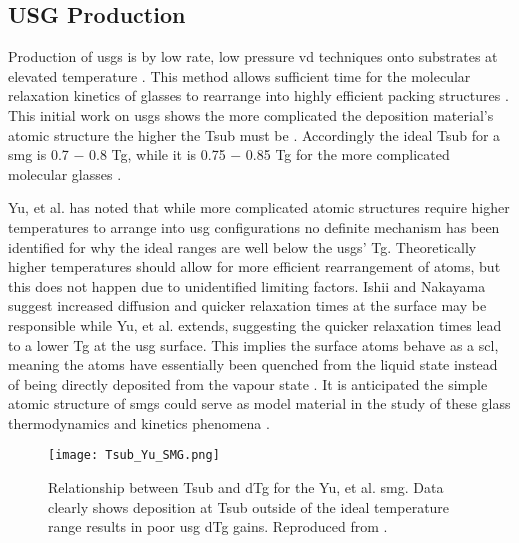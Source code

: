 \documentclass[a4paper,12pt,oneside]{report}%
\begin{document}
\subsection{USG Production}
Production of \glspl{usg} is by low rate, low pressure \gls{vd} techniques onto substrates at elevated temperature \cite{Ishii2014, Aji2013, Yu2013, Wang2014, Nakayama2013}. This method allows sufficient time for the molecular relaxation kinetics of glasses to rearrange into highly efficient packing structures \cite{Aji2013, Swallen2007, Wang2014}. This initial work on \glspl{usg} shows the more complicated the deposition material's atomic structure the higher the \gls{Tsub} must be \cite{Yu2013}. Accordingly the ideal \gls{Tsub} for a \gls{smg} is 0.7 $-$ 0.8 \gls{Tg}, while it is 0.75 $-$ 0.85 \gls{Tg} for the more complicated molecular glasses \cite{Swallen2007, Dawson2011, Yu2013, Dawson2010, Kearns2008}. 
 
Yu, et al. \cite{Yu2013} has noted that while more complicated atomic structures require higher temperatures to arrange into \gls{usg} configurations no definite mechanism has been identified for why the ideal ranges are well below the \glspl{usg}' \gls{Tg}. Theoretically higher temperatures should allow for more efficient rearrangement of atoms, but this does not happen due to unidentified limiting factors. Ishii and Nakayama \cite{Ishii2014} suggest increased diffusion and quicker relaxation times at the surface may be responsible while Yu, et al. \cite{Yu2013} extends, suggesting the quicker relaxation times lead to a lower \gls{Tg} at the \gls{usg} surface. This implies the surface atoms behave as a \gls{scl}, meaning the atoms have essentially been quenched from the liquid state instead of being directly deposited from the vapour state \cite{Yu2013}. It is anticipated the simple atomic structure of \glspl{smg} could serve as model material in the study of these glass thermodynamics and kinetics phenomena \cite{Yu2013, Wang2014}. 

\begin{figure}[htb]
	\centering
	\texttt{[image: Tsub\_Yu\_SMG.png]}
	\caption[Relationship between \acrshort{Tsub} and \acrshort{dTg} for the Yu, et al. \acrshort{smg}. Data clearly shows deposition at \acrshort{Tsub} outside of the ideal temperature range results in poor \acrshort{usg} \acrshort{dTg} gains.]{Relationship between \acrshort{Tsub} and \acrshort{dTg} for the Yu, et al. \cite{Yu2013} \acrshort{smg}. Data clearly shows deposition at \acrshort{Tsub} outside of the ideal temperature range results in poor \acrshort{usg} \acrshort{dTg} gains. Reproduced from \cite{Yu2013}.}
	\label{fig:YuTsub}
\end{figure}
\end{document}
